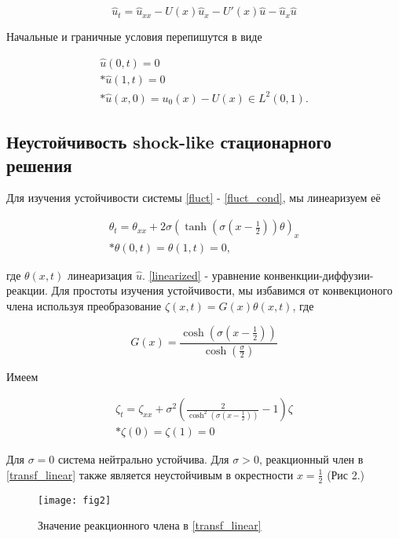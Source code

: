 \begin{equation}\label{fluct}
    \hat{u}_t = \hat{u}_{xx} - U(x)\hat{u}_x - U'(x)\hat{u} - \hat{u}_x\hat{u}
\end{equation}

Начальные и граничные условия перепишутся в виде

\begin{gather}\label{fluct_cond}
  \hat{u}(0, t) = 0 \\*
  \hat{u}(1, t) = 0 \\*
  \hat{u}(x, 0) = u_{0}(x) - U(x) \in L^2(0, 1). \nonumber
\end{gather}

\subsection{Неустойчивость shock-like стационарного решения}

Для изучения устойчивости системы \eqref{fluct} - \eqref{fluct_cond}, мы линеаризуем её

\begin{gather}\label{linearized}
  \theta_t = \theta_{xx} + 2 \sigma (\tanh(\sigma(x - \frac{1}{2}))\theta)_x \\*
  \theta(0, t) = \theta(1, t) = 0,
\end{gather}

где $\theta(x, t)$ линеаризация $\hat{u}$. \eqref{linearized} - уравнение конвенкции-диффузии-реакции. Для простоты изучения устойчивости, мы избавимся от конвекционого члена используя преобразование $\zeta(x, t) = G(x)\theta(x, t)$, где 

\begin{equation}
  G(x) = \frac{\cosh(\sigma(x - \frac{1}{2}))}{\cosh(\frac{\sigma}{2})}
\end{equation} 

Имеем 

\begin{gather} \label{transf_linear}
  \zeta_t = \zeta_{xx} + \sigma^2 \left( \frac{2}{\cosh^2(\sigma(x - \frac{1}{2}))} - 1 \right) \zeta \\* 
  \zeta(0) = \zeta(1) = 0 
\end{gather}

Для $\sigma = 0$ система нейтрально устойчива. Для $\sigma > 0$,  реакционный член в \eqref{transf_linear} также является неустойчивым в окрестности $x = \frac{1}{2}$ (Рис 2.)


\begin{figure}[H]
  \centering
  \texttt{[image: fig2]}
  \caption{Значение реакционного члена в \eqref{transf_linear}}
\end{figure}





